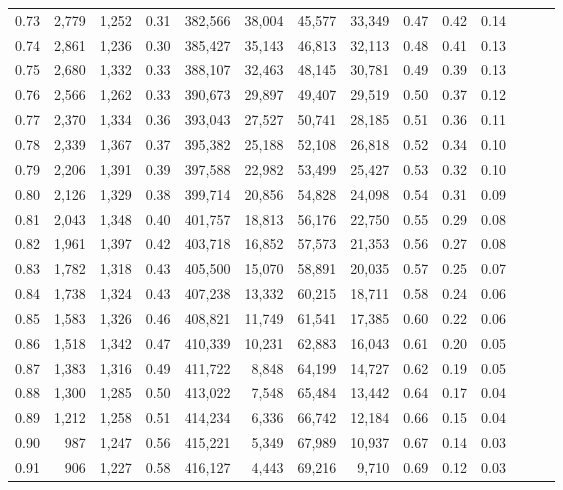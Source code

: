 \begin{tabular}{rrrrrrrrrrrrrr}
0.73 &  2,779 &  1,252 &  0.31 &  382,566 &   38,004 &  45,577 &  33,349 &  0.47 &  0.42 &      0.14 \\
0.74 &  2,861 &  1,236 &  0.30 &  385,427 &   35,143 &  46,813 &  32,113 &  0.48 &  0.41 &      0.13 \\
0.75 &  2,680 &  1,332 &  0.33 &  388,107 &   32,463 &  48,145 &  30,781 &  0.49 &  0.39 &      0.13 \\
0.76 &  2,566 &  1,262 &  0.33 &  390,673 &   29,897 &  49,407 &  29,519 &  0.50 &  0.37 &      0.12 \\
0.77 &  2,370 &  1,334 &  0.36 &  393,043 &   27,527 &  50,741 &  28,185 &  0.51 &  0.36 &      0.11 \\
0.78 &  2,339 &  1,367 &  0.37 &  395,382 &   25,188 &  52,108 &  26,818 &  0.52 &  0.34 &      0.10 \\
0.79 &  2,206 &  1,391 &  0.39 &  397,588 &   22,982 &  53,499 &  25,427 &  0.53 &  0.32 &      0.10 \\
0.80 &  2,126 &  1,329 &  0.38 &  399,714 &   20,856 &  54,828 &  24,098 &  0.54 &  0.31 &      0.09 \\
0.81 &  2,043 &  1,348 &  0.40 &  401,757 &   18,813 &  56,176 &  22,750 &  0.55 &  0.29 &      0.08 \\
0.82 &  1,961 &  1,397 &  0.42 &  403,718 &   16,852 &  57,573 &  21,353 &  0.56 &  0.27 &      0.08 \\
0.83 &  1,782 &  1,318 &  0.43 &  405,500 &   15,070 &  58,891 &  20,035 &  0.57 &  0.25 &      0.07 \\
0.84 &  1,738 &  1,324 &  0.43 &  407,238 &   13,332 &  60,215 &  18,711 &  0.58 &  0.24 &      0.06 \\
0.85 &  1,583 &  1,326 &  0.46 &  408,821 &   11,749 &  61,541 &  17,385 &  0.60 &  0.22 &      0.06 \\
0.86 &  1,518 &  1,342 &  0.47 &  410,339 &   10,231 &  62,883 &  16,043 &  0.61 &  0.20 &      0.05 \\
0.87 &  1,383 &  1,316 &  0.49 &  411,722 &    8,848 &  64,199 &  14,727 &  0.62 &  0.19 &      0.05 \\
0.88 &  1,300 &  1,285 &  0.50 &  413,022 &    7,548 &  65,484 &  13,442 &  0.64 &  0.17 &      0.04 \\
0.89 &  1,212 &  1,258 &  0.51 &  414,234 &    6,336 &  66,742 &  12,184 &  0.66 &  0.15 &      0.04 \\
0.90 &    987 &  1,247 &  0.56 &  415,221 &    5,349 &  67,989 &  10,937 &  0.67 &  0.14 &      0.03 \\
0.91 &    906 &  1,227 &  0.58 &  416,127 &    4,443 &  69,216 &   9,710 &  0.69 &  0.12 &      0.03 \\

\end{tabular}

